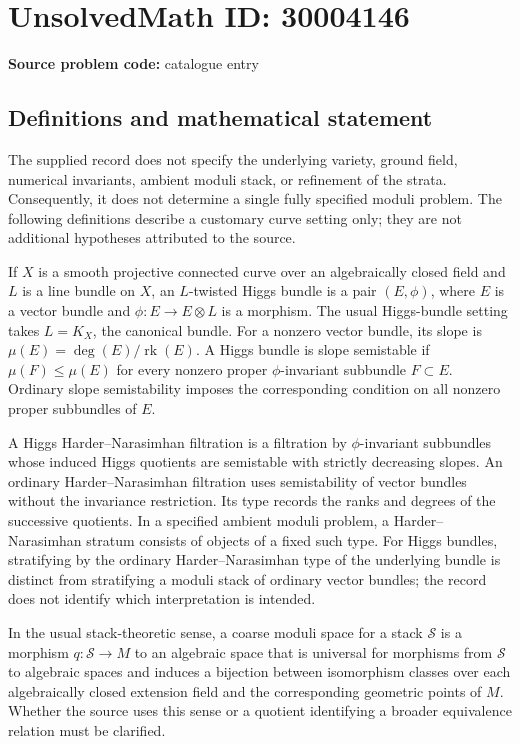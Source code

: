 \documentclass[11pt]{article}
\begin{document}
\section*{UnsolvedMath ID: 30004146}
\textbf{Source problem code:} catalogue entry
\subsection{Definitions and mathematical statement}
The supplied record does not specify the underlying variety, ground field, numerical invariants, ambient moduli stack, or refinement of the strata. Consequently, it does not determine a single fully specified moduli problem. The following definitions describe a customary curve setting only; they are not additional hypotheses attributed to the source.

If \(X\) is a smooth projective connected curve over an algebraically closed field and \(L\) is a line bundle on \(X\), an \(L\)-twisted Higgs bundle is a pair \((E,\phi)\), where \(E\) is a vector bundle and \(\phi:E\to E\otimes L\) is a morphism. The usual Higgs-bundle setting takes \(L=K_X\), the canonical bundle. For a nonzero vector bundle, its slope is \(\mu(E)=\deg(E)/\operatorname{rk}(E)\). A Higgs bundle is slope semistable if \(\mu(F)\leq\mu(E)\) for every nonzero proper \(\phi\)-invariant subbundle \(F\subset E\). Ordinary slope semistability imposes the corresponding condition on all nonzero proper subbundles of \(E\).

A Higgs Harder--Narasimhan filtration is a filtration by \(\phi\)-invariant subbundles whose induced Higgs quotients are semistable with strictly decreasing slopes. An ordinary Harder--Narasimhan filtration uses semistability of vector bundles without the invariance restriction. Its type records the ranks and degrees of the successive quotients. In a specified ambient moduli problem, a Harder--Narasimhan stratum consists of objects of a fixed such type. For Higgs bundles, stratifying by the ordinary Harder--Narasimhan type of the underlying bundle is distinct from stratifying a moduli stack of ordinary vector bundles; the record does not identify which interpretation is intended.

In the usual stack-theoretic sense, a coarse moduli space for a stack \(\mathcal S\) is a morphism \(q:\mathcal S\to M\) to an algebraic space that is universal for morphisms from \(\mathcal S\) to algebraic spaces and induces a bijection between isomorphism classes over each algebraically closed extension field and the corresponding geometric points of \(M\). Whether the source uses this sense or a quotient identifying a broader equivalence relation must be clarified.
\end{document}
